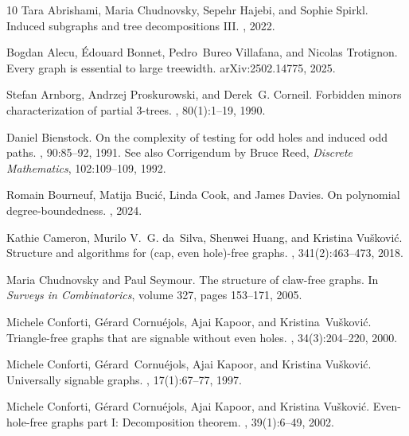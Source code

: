 \documentclass[11pt]{article}
\begin{document}
\begin{thebibliography}{10}
Tara Abrishami, Maria Chudnovsky, Sepehr Hajebi, and Sophie Spirkl.
\newblock Induced subgraphs and tree decompositions {III}.
, 2022.

Bogdan Alecu, {\'E}douard Bonnet, Pedro~Bureo Villafana, and Nicolas Trotignon.
\newblock Every graph is essential to large treewidth.
\newblock arXiv:2502.14775, 2025.

Stefan Arnborg, Andrzej Proskurowski, and Derek~G. Corneil.
\newblock Forbidden minors characterization of partial 3-trees.
, 80(1):1--19, 1990.

Daniel Bienstock.
\newblock On the complexity of testing for odd holes and induced odd paths.
, 90:85--92, 1991.
\newblock See also Corrigendum by Bruce Reed, {\it Discrete Mathematics},
  102:109--109, 1992.

Romain Bourneuf, Matija Buci{\' c}, Linda Cook, and James Davies.
\newblock On polynomial degree-boundedness.
, 2024.

Kathie Cameron, Murilo V.~G. da~Silva, Shenwei Huang, and {Kristina Vu\v
  skovi\'c}.
\newblock Structure and algorithms for (cap, even hole)-free graphs.
, 341(2):463--473, 2018.

Maria Chudnovsky and Paul Seymour.
\newblock The structure of claw-free graphs.
\newblock In {\em Surveys in Combinatorics}, volume 327, pages 153--171, 2005.

Michele Conforti, G{\'{e}}rard Cornu{\'{e}}jols, Ajai Kapoor, and Kristina~Vu\v
  skovi\'c.
\newblock Triangle-free graphs that are signable without even holes.
, 34(3):204--220, 2000.

Michele Conforti, G{\'erard}~Cornu{\'e}jols, Ajai Kapoor, and Kristina Vu{\v
  s}kovi{\' c}.
\newblock Universally signable graphs.
, 17(1):67--77, 1997.

Michele Conforti, G{\'e}rard Cornu{\'e}jols, Ajai Kapoor, and Kristina Vu{\v
  s}kovi{\'c}.
\newblock Even-hole-free graphs part {I}: {D}ecomposition theorem.
, 39(1):6--49, 2002.


\end{thebibliography}
\end{document}

